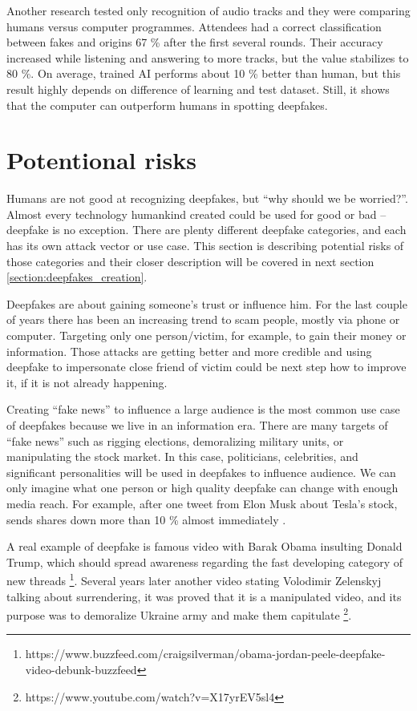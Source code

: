 Another research tested only recognition of audio tracks and they were comparing humans versus computer programmes. Attendees had a correct classification between fakes and origins 67 \% after the first several rounds. Their accuracy increased while listening and answering to more tracks, but the value stabilizes to 80 \%. On average, trained AI performs about 10 \% better than human, but this result highly depends on difference of learning and test dataset. Still, it shows that the computer can outperform humans in spotting deepfakes. \cite{HumanPerceptionAudio}

\section{Potentional risks}

Humans are not good at recognizing deepfakes, but “why should we be worried?”. Almost every technology humankind created could be used for good or bad – deepfake is no exception. There are plenty different deepfake categories, and each has its own attack vector or use case. This section is describing potential risks of those categories and their closer description will be covered in next section \ref{section:deepfakes_creation}.

Deepfakes are about gaining someone’s trust or influence him. For the last couple of years there has been an increasing trend to scam people, mostly via phone or computer. Targeting only one person/victim, for example, to gain their money or information. Those attacks are getting better and more credible and using deepfake to impersonate close friend of victim could be next step how to improve it, if it is not already happening. \cite{HybridVishingAttacksSkyrocketing}

Creating “fake news” to influence a large audience is the most common use case of deepfakes because we live in an information era. There are many targets of “fake news” such as rigging elections, demoralizing military units, or manipulating the stock market. In this case, politicians, celebrities, and significant personalities will be used in deepfakes to influence audience. We can only imagine what one person or high quality deepfake can change with enough media reach. For example, after one tweet from Elon Musk about Tesla’s stock, sends shares down more than 10 \% almost immediately \cite{ElonMusksTweets}. \cite{IncreasingThreatofDeepfakeIdentites}

A real example of deepfake is famous video with Barak Obama insulting Donald Trump, which should spread awareness regarding the fast developing category of new threads \footnote{https://www.buzzfeed.com/craigsilverman/obama-jordan-peele-deepfake-video-debunk-buzzfeed}. Several years later another video stating Volodimir Zelenskyj talking about surrendering, it was proved that it is a manipulated video, and its purpose was to demoralize Ukraine army and make them capitulate \footnote{https://www.youtube.com/watch?v=X17yrEV5sl4}.

